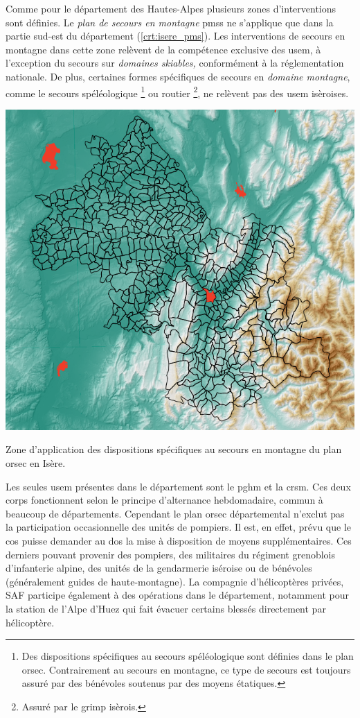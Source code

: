 Comme pour le département des Hautes-Alpes plusieurs zones
d'interventions sont définies. Le \emph{plan de secours en montagne}
\acp{pms} ne s'applique que dans la partie sud-est du département
(\autoref{crt:isere_pms}). Les interventions de secours en montagne
dans cette zone relèvent de la compétence exclusive des \ac{usem}, à
l'exception du secours sur \emph{domaines skiables,} conformément à la
réglementation nationale. De plus, certaines formes spécifiques de
secours en \emph{domaine montagne}, comme le secours spéléologique
\footnote{Des dispositions spécifiques au secours spéléologique sont
  définies dans le plan \ac{orsec}. Contrairement au secours en
  montagne, ce type de secours est toujours assuré par des bénévoles
  soutenus par des moyens étatiques.} ou routier \footnote{Assuré par
  le \ac{grimp} isèrois.}, ne relèvent pas des \ac{usem} isèroises.

\begin{carte}
  \centering
  \includegraphics{../figures/Out1.png}
  \caption{Zone d'application des dispositions spécifiques au secours
    en montagne du plan \ac{orsec} en Isère.}
  \label{crt:isere_pms}
\end{carte}

Les seules \ac{usem} présentes dans le département sont le \ac{pghm}
et la \ac{crsm}. Ces deux corps fonctionnent selon le principe
d'alternance hebdomadaire, commun à beaucoup de
départements. Cependant le plan \ac{orsec} départemental n’exclut pas
la participation occasionnelle des unités de pompiers. Il est, en
effet, prévu que le \ac{cos} puisse demander au \ac{dos} la mise à
disposition de moyens supplémentaires. Ces derniers pouvant provenir
des pompiers, des militaires du régiment grenoblois d’infanterie
alpine, des unités de la gendarmerie iséroise ou de bénévoles
(généralement guides de haute-montagne).
La compagnie d'hélicoptères privées, SAF participe également à des
opérations dans le département, notamment pour la station de l'Alpe
d'Huez qui fait évacuer certains blessés directement par hélicoptère.

